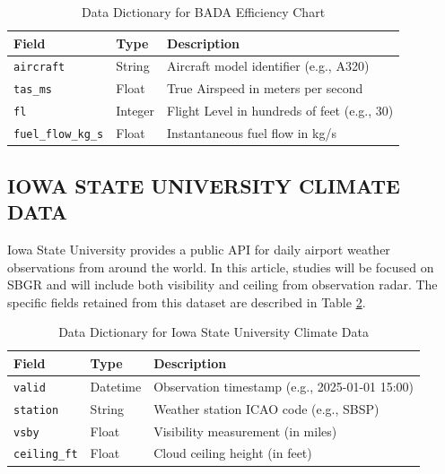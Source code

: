 \begin{table}[htbp]
\caption{Data Dictionary for BADA Efficiency Chart}
\label{tab:bada_dict}
\centering
\begin{tabular}{m{} m{} m{}}
\hline
\textbf{Field} & \textbf{Type} & \textbf{Description} \\
\hline
\texttt{aircraft} & String & Aircraft model identifier (e.g., A320) \\
\texttt{tas\_ms} & Float & True Airspeed in meters per second \\
\texttt{fl} & Integer & Flight Level in hundreds of feet (e.g., 30) \\
\texttt{fuel\_flow\_kg\_s} & Float & Instantaneous fuel flow in kg/s \\
\hline
\end{tabular}
\end{table}

\subsection{IOWA STATE UNIVERSITY CLIMATE DATA}
Iowa State University provides a public API for daily airport weather observations from around the world. In this article, studies will be focused on SBGR and will include both visibility and ceiling from observation radar. The specific fields retained from this dataset are described in Table \ref{tab:climate_dict}.

\begin{table}[htbp]
\caption{Data Dictionary for Iowa State University Climate Data}
\label{tab:climate_dict}
\centering
\begin{tabular}{m{} m{} m{}}
\hline
\textbf{Field} & \textbf{Type} & \textbf{Description} \\
\hline
\texttt{valid} & Datetime & Observation timestamp (e.g., 2025-01-01 15:00) \\
\texttt{station} & String & Weather station ICAO code (e.g., SBSP) \\
\texttt{vsby} & Float & Visibility measurement (in miles) \\
\texttt{ceiling\_ft} & Float & Cloud ceiling height (in feet) \\
\hline
\end{tabular}
\end{table}